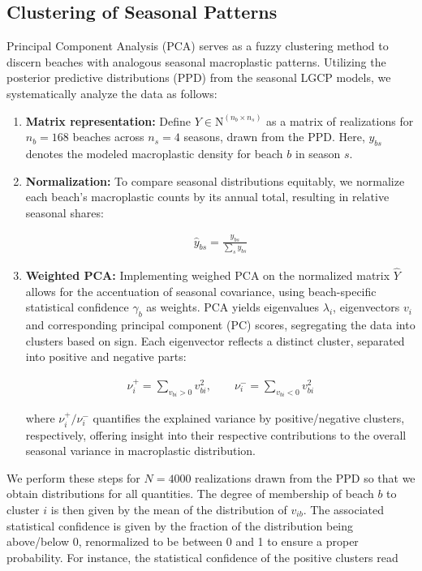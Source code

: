 \subsection{Clustering of Seasonal Patterns}\label{sec:plastics:methods:clustering}
Principal Component Analysis (PCA) serves as a fuzzy clustering method \cite{drineas_clustering_2004} to discern beaches with analogous seasonal macroplastic patterns. Utilizing the posterior predictive distributions (PPD) from the seasonal LGCP models, we systematically analyze the data as follows:
\begin{enumerate}
    \item \textbf{Matrix representation:} Define $Y \in \mathrm{N}^{(n_b \times n_s)}$ as a matrix of realizations for $n_b=168$ beaches across $n_s=4$ seasons, drawn from the PPD. Here, $y_{bs}$ denotes the modeled macroplastic density for beach $b$ in season $s$.
    \item \textbf{Normalization:} To compare seasonal distributions equitably, we normalize each beach's macroplastic counts by its annual total, resulting in relative seasonal shares:

    \begin{align}
    \hat{y}_{bs} = \frac{y_{bs}}{\sum_s y_{bs}}    
    \end{align}
    
    \item \textbf{Weighted PCA:} Implementing weighed PCA on the normalized matrix $\hat{Y}$ allows for the accentuation of seasonal covariance, using beach-specific statistical confidence $\gamma_b$ as weights. PCA yields eigenvalues $\lambda_i$, eigenvectors $v_i$ and corresponding principal component (PC) scores, segregating the data into clusters based on sign. Each eigenvector reflects a distinct cluster, separated into positive and negative parts:

    \begin{align}
    \nu_i^+ = \sum_{v_{bi} > 0} v_{bi}^2, \qquad \nu_i^- = \sum_{v_{bi} < 0} v_{bi}^2
    \end{align}
    
    where $\nu_i^+/\nu_i^-$ quantifies the explained variance by positive/negative clusters, respectively, offering insight into their respective contributions to the overall seasonal variance in macroplastic distribution.
\end{enumerate}

We perform these steps for $N=4000$ realizations drawn from the PPD so that we obtain distributions for all quantities. The degree of membership of beach $b$ to cluster $i$ is then given by the mean of the distribution of $v_{ib}$. The associated statistical confidence is given by the fraction of the distribution being above/below 0, renormalized to be between 0 and 1 to ensure a proper probability. For instance, the statistical confidence of the positive clusters read

